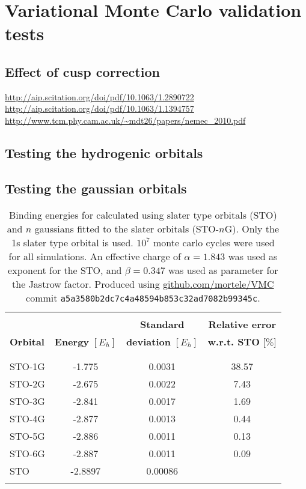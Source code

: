 \documentclass[../../master.tex]{subfiles}
\begin{document}
\renewcommand{\R}{{\bf R}}
\renewcommand{\r}{{\bf r}}
\newcommand{\p}{{\bf p}}
\newcommand{\q}{{\bf q}}
\renewcommand{\H}{\mathcal{H}}
\newcommand{\psit}{\left|\psi(t)\right\rangle}


\section{Variational Monte Carlo validation tests}
\subsection{Effect of cusp correction}
\url{http://aip.scitation.org/doi/pdf/10.1063/1.2890722}
\url{http://aip.scitation.org/doi/pdf/10.1063/1.1394757}
\url{http://www.tcm.phy.cam.ac.uk/~mdt26/papers/nemec_2010.pdf}


\subsection{Testing the hydrogenic orbitals}

\subsection{Testing the gaussian orbitals}

\begin{table}
\centering{}
\setlength\extrarowheight{2pt}
\begin{tabularx}{\textwidth}{X *{3}{S[table-format=-1.3,table-space-text-post=***]}}
\hline
\hline
\\[-0.9em]
                 &                          & \textbf{Standard}          & \textbf{Relative error}    \\
\textbf{Orbital} & \textbf{Energy} $[E_h]$  & \textbf{deviation} $[E_h]$ & \textbf{w.r.t. STO} [$\%$]  \\
\\[-0.9em]
\hline
\\[-0.9em]
STO-1G & -1.775  & 0.0031  &  38.57 \\
STO-2G & -2.675  & 0.0022  &   7.43 \\
STO-3G & -2.841  & 0.0017  &   1.69 \\
STO-4G & -2.877  & 0.0013  &   0.44 \\
STO-5G & -2.886  & 0.0011  &   0.13 \\
STO-6G & -2.887  & 0.0011  &   0.09 \\
STO    & -2.8897 & 0.00086 & \\
\\[-0.9em]
\hline
\end{tabularx}
\caption{Binding energies for  calculated using slater type orbitals (STO) and $n$ gaussians fitted to the slater orbitals (STO-$n$G). Only the 1s slater type orbital is used. $10^7$ monte carlo cycles were used for all simulations. An effective charge of $\alpha=1.843$ was used as exponent for the STO, and $\beta=0.347$ was used as parameter for the Jastrow factor. Produced using \url{github.com/mortele/VMC} commit \texttt{a5a3580b2dc7c4a48594b853c32ad7082b99345c}. \label{tab:vmcv1}}
\end{table}
\end{document}
